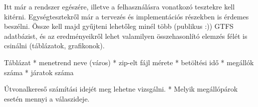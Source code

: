 
Itt már a rendszer egészére, illetve a felhasználásra vonatkozó tesztekre kell kitérni.
Egységtesztekről már a tervezés és implementációs részekben is érdemes beszélni.
Össze kell majd gyűjteni lehetőleg minél több (publikus :)) GTFS adatbázist, és az eredményeikről lehet valamilyen összehasonlító elemzés félét is csinálni (táblázatok, grafikonok).

Táblázat
* menetrend neve (város)
* zip-elt fájl mérete
* betöltési idő
* megállók száma
* járatok száma

Útvonalkereső számítási idejét meg lehetne vizsgálni.
* Melyik megállópárok esetén mennyi a válaszideje.
